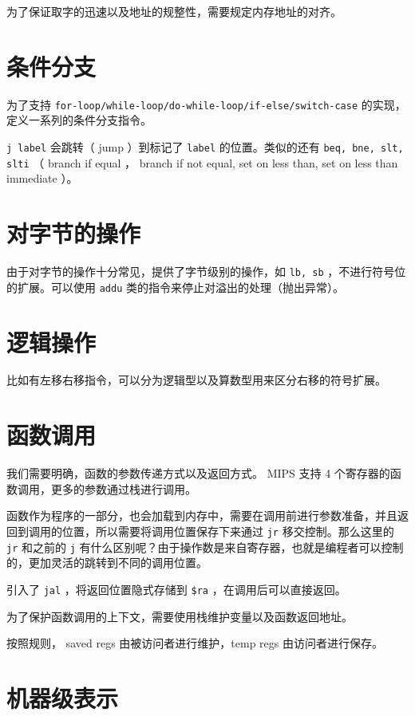 \documentclass[cn,11pt,chinese,black,simple]{../elegantbook}
\begin{document}
为了保证取字的迅速以及地址的规整性，需要规定内存地址的对齐。

\section{条件分支}

为了支持 \lstinline{for-loop/while-loop/do-while-loop/if-else/switch-case} 的实现，定义一系列的条件分支指令。

\lstinline{j label} 会跳转（ jump ）到标记了 \lstinline{label} 的位置。类似的还有 \lstinline{beq, bne, slt, slti} （ branch if equal ， branch if not equal, set on less than, set on less than immediate ）。

\section{对字节的操作}

由于对字节的操作十分常见，提供了字节级别的操作，如 \lstinline{lb, sb} ，不进行符号位的扩展。可以使用 \lstinline{addu} 类的指令来停止对溢出的处理（抛出异常）。

\section{逻辑操作}

比如有左移右移指令，可以分为逻辑型以及算数型用来区分右移的符号扩展。

\section{函数调用}

我们需要明确，函数的参数传递方式以及返回方式。 MIPS 支持 4 个寄存器的函数调用，更多的参数通过栈进行调用。

函数作为程序的一部分，也会加载到内存中，需要在调用前进行参数准备，并且返回到调用的位置，所以需要将调用位置保存下来通过 \lstinline{jr} 移交控制。那么这里的 \lstinline{jr} 和之前的 \lstinline{j} 有什么区别呢？由于操作数是来自寄存器，也就是编程者可以控制的，更加灵活的跳转到不同的调用位置。

引入了 \lstinline{jal} ，将返回位置隐式存储到 \lstinline{$ra} ，在调用后可以直接返回。

为了保护函数调用的上下文，需要使用栈维护变量以及函数返回地址。

按照规则， saved regs 由被访问者进行维护，temp regs 由访问者进行保存。

\section{机器级表示}


\let\chapname\undefined
\ifx\mainclass\undefined
\end{document}
